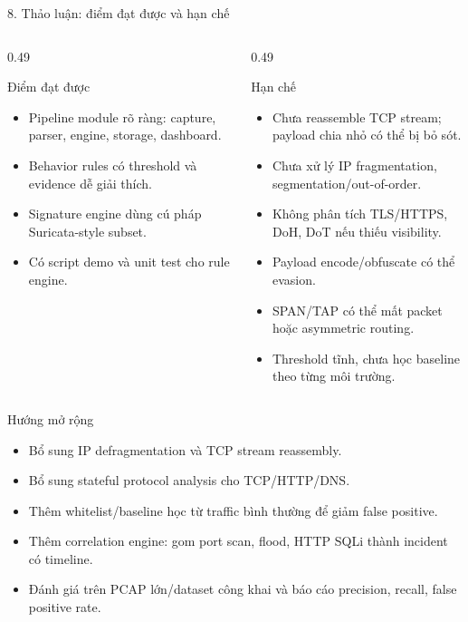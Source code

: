 \documentclass[t, aspectratio=169]{beamer}
\begin{document}
\begin{frame}{8. Thảo luận: điểm đạt được và hạn chế}
    \small
    \begin{columns}[T,onlytextwidth]
        \begin{column}{0.49\textwidth}
            \begin{block}{Điểm đạt được}
                \begin{itemize}
                    \item Pipeline module rõ ràng: capture, parser, engine, storage, dashboard.
                    \item Behavior rules có threshold và evidence dễ giải thích.
                    \item Signature engine dùng cú pháp Suricata-style subset.
                    \item Có script demo và unit test cho rule engine.
                \end{itemize}
            \end{block}
        \end{column}
        \begin{column}{0.49\textwidth}
            \begin{alertblock}{Hạn chế}
                \begin{itemize}
                    \item Chưa reassemble TCP stream; payload chia nhỏ có thể bị bỏ sót.
                    \item Chưa xử lý IP fragmentation, segmentation/out-of-order.
                    \item Không phân tích TLS/HTTPS, DoH, DoT nếu thiếu visibility.
                    \item Payload encode/obfuscate có thể evasion.
                    \item SPAN/TAP có thể mất packet hoặc asymmetric routing.
                    \item Threshold tĩnh, chưa học baseline theo từng môi trường.
                \end{itemize}
            \end{alertblock}
        \end{column}
    \end{columns}
\end{frame}

\begin{frame}{Hướng mở rộng}
    \begin{itemize}
        \item Bổ sung IP defragmentation và TCP stream reassembly.
        \item Bổ sung stateful protocol analysis cho TCP/HTTP/DNS.
        \item Thêm whitelist/baseline học từ traffic bình thường để giảm false positive.
        \item Thêm correlation engine: gom port scan, flood, HTTP SQLi thành incident có timeline.
        \item Đánh giá trên PCAP lớn/dataset công khai và báo cáo precision, recall, false positive rate.
    \end{itemize}
\end{frame}
\end{document}
